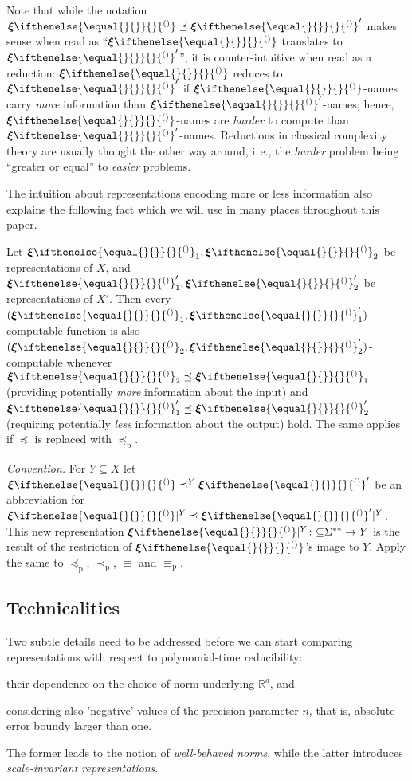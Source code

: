 \documentclass{CSML}
\newcommand{\representation}[2]{ #1\ifnotempty{#2}{^{(#2)}} }
\newcommand{\IR}{\mathbb{R}}
\newcommand{\parcol}{\colon\mathnormal\subseteq}
\newcommand{\Baire}{\Sigma^{\ast\ast}}
\newcommand{\reptpl}[1][\empty]{ \representation{\bm{\xi}}{#1} }
\newcommand{\ifnotempty}[2]{ \ifthenelse{ \equal{#1}{\empty} }{}{#2} }
\newcommand{\pleq}{\preceq_\mathrm{p}}
\newcommand{\pless}{\prec_\mathrm{p}}
\newcommand{\pequiv}{\equiv_\mathrm{p}}
\newcommand{\ie}{\mbox{i.\,e.}\xspace}
\begin{document}
Note that while the notation $\reptpl \preceq \reptpl'$ makes sense when read
as ``$\reptpl$ translates to $\reptpl'$'', it is counter-intuitive when read
as a reduction:
$\reptpl$ reduces to $\reptpl'$ if $\reptpl$-names carry
\emph{more} information than $\reptpl'$-names; hence, $\reptpl$-names are
\emph{harder} to compute than $\reptpl'$-names.
Reductions in classical complexity theory are usually thought the other way
around, \ie, the \emph{harder} problem being ``greater or equal'' to
\emph{easier} problems.

The intuition about representations encoding more or less information
also explains the following fact which we will use in many places throughout
this paper.

\begin{fact}
Let $\reptpl_1,\reptpl_2$ be representations of $X$, and
$\reptpl'_1,\reptpl'_2$ be representations of $X'$.
Then every $(\reptpl_1,\reptpl'_1)$-computable function is also
$(\reptpl_2,\reptpl'_2)$-computable whenever $\reptpl_2 \preceq \reptpl_1$
(providing potentially \emph{more} information about the input) and
$\reptpl'_1 \preceq \reptpl'_2$ (requiring potentially \emph{less} information
about the output) hold. The same applies if $\preceq$ is replaced with $\pleq$.
\end{fact}

\emph{Convention.}
For $Y \subseteq X$ let $\reptpl \preceq^Y \reptpl'$ be an abbreviation for
$\reptpl|^Y \preceq \reptpl'|^Y$. This new representation
$\reptpl|^Y \parcol \Baire \to Y$ is the result of the restriction of
$\reptpl$'s image to $Y$.
Apply the same to $\pleq$, $\pless$, $\equiv$ and $\pequiv$.




\subsection{Technicalities}


Two subtle details need to be addressed before we can start comparing
representations with respect to polynomial-time reducibility:
\begin{enumerate*}[label=(\emph{\alph*})]
\item their dependence on the choice of norm underlying $\IR^d$, and
\item considering also 'negative' values of the precision parameter $n$,
   that is, absolute error boundy larger than one.
\end{enumerate*}
The former leads to the notion of \emph{well-behaved norms}, while the latter
introduces \emph{scale-invariant representations}.
\end{document}
